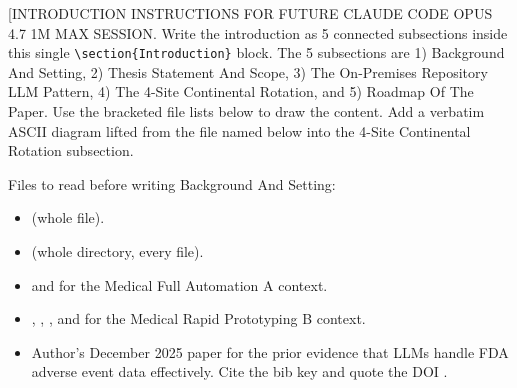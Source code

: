 %
%

\begin{sectionaccent}

[INTRODUCTION INSTRUCTIONS FOR FUTURE CLAUDE CODE OPUS 4.7 1M MAX SESSION.
Write the introduction as 5 connected subsections inside this single
\texttt{\textbackslash section\{Introduction\}} block. The 5 subsections are
1) Background And Setting, 2) Thesis Statement And Scope, 3) The
On-Premises Repository LLM Pattern, 4) The 4-Site Continental Rotation,
and 5) Roadmap Of The Paper. Use the bracketed file lists below to
draw the content. Add a verbatim ASCII diagram lifted from the file
named below into the 4-Site Continental Rotation subsection.

Files to read before writing Background And Setting:
\begin{itemize}
  \item {}
        (whole file).
  \item {}
        (whole directory, every file).
  \item {}
        and  for the Medical Full
        Automation A context.
  \item {},
        ,
        , and
        for the Medical Rapid Prototyping B context.
  \item Author's December 2025 paper
         for the prior evidence that
        LLMs handle FDA adverse event data effectively. Cite the bib
        key  and quote the DOI
        .
\end{itemize}


\end{sectionaccent}
